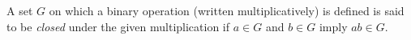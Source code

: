 A set $G$ on which a binary operation (written multiplicatively) is defined is said to be \textit{closed} under the given multiplication if $a \in G$ and $b \in G$ imply $ab \in G$.
